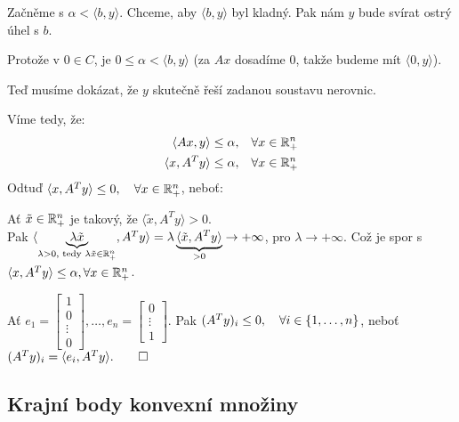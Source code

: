 Začněme s $\alpha < \langle b, y\rangle$. Chceme, aby $\langle b, y\rangle$ byl kladný. Pak nám $y$ bude svírat ostrý 
úhel s $b$. 

Protože v $0 \in C$, je $0 \leq \alpha < \langle b,y \rangle$ (za $Ax$ dosadíme $0$, takže budeme mít 
$\langle 0, y\rangle$).

Teď musíme dokázat, že $y$ skutečně řeší zadanou soustavu nerovnic.

Víme tedy, že:
\begin{align*}
    \langle Ax, y\rangle \leq \alpha,  &\quad \forall x \in \mathbb{R}^n_+ \\
    \langle x, A^T y\rangle \leq \alpha, &\quad \forall x \in \mathbb{R}^n_+
\end{align*}
Odtuď $\langle x, A^T y\rangle \leq 0, \quad \forall x \in \mathbb{R}^n_+$, neboť:

Ať $\tilde x \in \mathbb{R}^n_+$ je takový, že $\langle \tilde x, A^T y\rangle > 0$.\\
Pak $\langle \underbrace{\lambda \tilde x}_{\lambda > 0, \text{ tedy } \lambda \tilde x \in \mathbb{R}^n_+}, A^T y\rangle = 
\lambda \underbrace{\langle \tilde x, A^T y\rangle}_{> 0} \rightarrow + \infty$, pro $\lambda \rightarrow + \infty$.
Což je spor s $\langle x, A^T y\rangle \leq \alpha, \forall x \in \mathbb{R}^n_+$.

Ať $e_1=
\begin{bmatrix}
    1 \\
    0 \\
    \vdots \\
    0
\end{bmatrix}, \dots, e_n = 
\begin{bmatrix}
    0 \\
    \vdots \\
    1
\end{bmatrix}$. Pak $(A^T y)_i \leq 0, \quad \forall i \in \left\lbrace 1, \dots, n \right\rbrace$, neboť $(A^T y)_i = 
\langle e_i, A^T y\rangle. \qed$

\subsection{Krajní body konvexní množiny}


